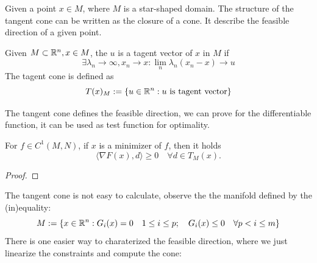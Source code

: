 \begin{definition}
\end{definition}

Given a point $x \in M$, where $M$ is a star-shaped domain. The structure of the tangent cone can be written as the closure of a cone. It describe the feasible direction of a given point. 
\begin{definition}
	Given $M \subset \mathbb{R}^n, x \in M$, the $u$ is a tagent vector of $x$ in $M$ if 
	\begin{equation}
		\exists \lambda_n \rightarrow \infty, x_n \rightarrow x: \lim_n \lambda_n (x_n - x) \rightarrow u
	\end{equation} 
	The tagent cone is defined as 
	\[
	T(x)_M:= \{u \in \mathbb{R}^n: u \text{ is tagent vector} \}
	\]
\end{definition}

The tangent cone defines the feasible direction, we can prove for the differentiable function, it can be used as test function for optimality.

\begin{theorem}
	For $f \in C^1(M, N)$, if $x$ is a minimizer of $f$, then it holds
	\begin{equation}
		\langle \nabla F(x), d \rangle \ge 0 \quad \forall d \in T_M(x).
	\end{equation}
\end{theorem}
\begin{proof}
\end{proof}

The tangent cone is not easy to calculate, observe the the manifold defined by the (in)equality: 
\[
M: = \{ x \in \mathbb{R}^n: G_i(x) = 0 \quad 1 \le i \le p ;\quad G_i(x)\le 0 \quad \forall p < i \le m\} 
\]
There is one easier way to charaterized the feasible direction, where we just linearize the constraints and compute the cone:  

